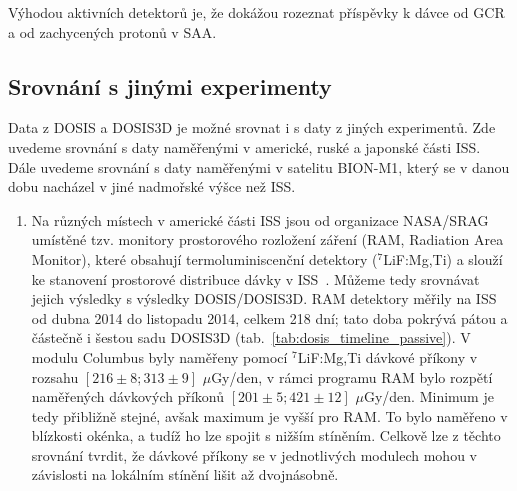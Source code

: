 Výhodou aktivních detektorů je, že dokážou rozeznat příspěvky k dávce od GCR a od zachycených protonů v SAA.
\subsection{Srovnání s jinými experimenty}
Data z DOSIS a DOSIS3D je možné srovnat i s daty z jiných experimentů. Zde uvedeme srovnání s daty naměřenými v americké, ruské a japonské části ISS. Dále uvedeme srovnání s daty naměřenými v satelitu BION-M1, který se v danou dobu nacházel v jiné nadmořské výšce než ISS.
\begin{enumerate}
\item Na různých místech v americké části ISS jsou od organizace NASA/SRAG umístěné tzv. monitory prostorového rozložení záření (RAM, Radiation Area Monitor), které obsahují termoluminiscenční detektory ($^7$LiF:Mg,Ti) a slouží ke stanovení prostorové distribuce dávky v ISS~\cite{RAM}. Můžeme tedy srovnávat jejich výsledky s výsledky DOSIS/DOSIS3D. RAM detektory měřily na ISS od dubna 2014 do listopadu 2014, celkem 218 dní; tato doba pokrývá pátou a částečně i šestou sadu DOSIS3D (tab.~\ref{tab:dosis_timeline_passive}). V modulu Columbus byly naměřeny pomocí $^7$LiF:Mg,Ti dávkové příkony v rozsahu $[216\pm8;313\pm9]$ $\mu$Gy/den, v rámci programu RAM bylo rozpětí naměřených dávkových příkonů $[201\pm5;421\pm12]$ $\mu$Gy/den. Minimum je tedy přibližně stejné, avšak maximum je vyšší pro RAM. To bylo naměřeno v
  blízkosti okénka, a tudíž ho lze spojit s nižším stíněním. Celkově lze z těchto srovnání tvrdit, že dávkové příkony se v jednotlivých modulech mohou v závislosti na lokálním stínění lišit až dvojnásobně.~\cite{dosis}


\end{enumerate}
